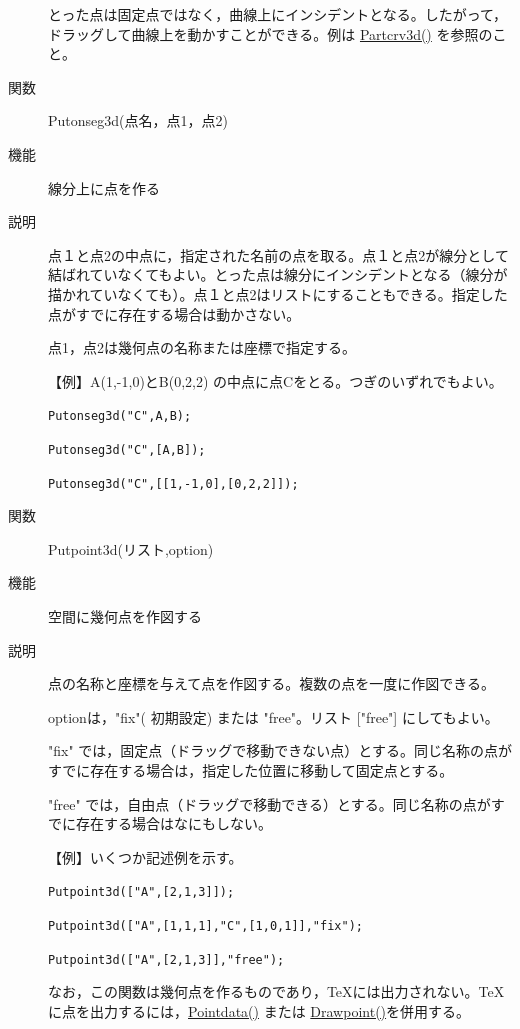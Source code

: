 \documentclass[papersize,a4paper,12pt,uplatex]{jsarticle}
\begin{document}
\begin{description}
とった点は固定点ではなく，曲線上にインシデントとなる。したがって，ドラッグして曲線上を動かすことができる。例は \hyperlink{partcrv3d}{Partcrv3d()} を参照のこと。

\vspace{\baselineskip}
\hypertarget{putonseg3d}{}
\item[関数]  Putonseg3d(点名，点1，点2)
\item[機能]  線分上に点を作る
\item[説明]  点１と点2の中点に，指定された名前の点を取る。点１と点2が線分として結ばれていなくてもよい。とった点は線分にインシデントとなる（線分が描かれていなくても）。点１と点2はリストにすることもできる。指定した点がすでに存在する場合は動かさない。

点1，点2は幾何点の名称または座標で指定する。

\vspace{\baselineskip}
【例】A(1,-1,0)とB(0,2,2) の中点に点Cをとる。つぎのいずれでもよい。

    \verb|Putonseg3d("C",A,B);|

    \verb|Putonseg3d("C",[A,B]);|
    
    \verb|Putonseg3d("C",[[1,-1,0],[0,2,2]]);|

\vspace{\baselineskip}

\hypertarget{putpoint3d}{}
\item[関数]  Putpoint3d(リスト,option)
\item[機能]  空間に幾何点を作図する
\item[説明]  点の名称と座標を与えて点を作図する。複数の点を一度に作図できる。

optionは，"fix"( 初期設定) または "free"。リスト ["free"] にしてもよい。
 
"fix" では，固定点（ドラッグで移動できない点）とする。同じ名称の点がすでに存在する場合は，指定した位置に移動して固定点とする。

"free" では，自由点（ドラッグで移動できる）とする。同じ名称の点がすでに存在する場合はなにもしない。

\vspace{\baselineskip}
【例】いくつか記述例を示す。

    \verb|Putpoint3d(["A",[2,1,3]]);|
    
    \verb|Putpoint3d(["A",[1,1,1],"C",[1,0,1]],"fix");|
    
    \verb|Putpoint3d(["A",[2,1,3]],"free");|
    
\vspace{\baselineskip}
  なお，この関数は幾何点を作るものであり，TeXには出力されない。TeXに点を出力するには，\hyperlink{pointdata}{Pointdata()} または \hyperlink{drwpt}{Drawpoint()}を併用する。
  

\end{description}
\end{document}
